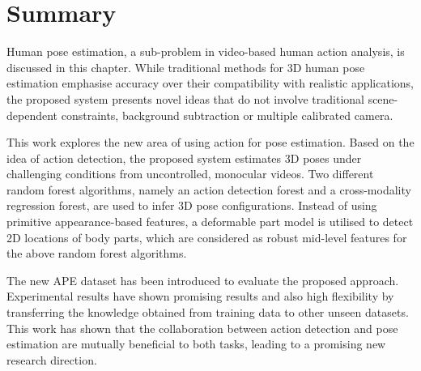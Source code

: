 

\section{Summary}
\label{sec/body/conclusions}

Human pose estimation, a sub-problem in video-based human action analysis, is discussed in this chapter.  
While traditional methods for 3D human pose estimation emphasise accuracy over their compatibility with realistic applications, the proposed system presents novel ideas that do not involve traditional scene-dependent constraints, \eg background subtraction or multiple calibrated camera.

This work explores the new area of using action for pose estimation. 
Based on the idea of action detection, the proposed system estimates 3D poses under challenging conditions from uncontrolled, monocular videos.
Two different random forest algorithms, namely an action detection forest and a cross-modality regression forest, are used to infer 3D pose configurations. Instead of using primitive appearance-based features, a deformable part model is utilised to detect 2D locations of body parts, which are considered as robust mid-level features for the above random forest algorithms.

The new APE dataset has been introduced to evaluate the proposed approach.  
Experimental results have shown promising results and also high flexibility by transferring the knowledge obtained from training data to other unseen datasets. This work has shown that the collaboration between action detection and pose estimation are mutually beneficial to both tasks, leading to a promising new research direction.

